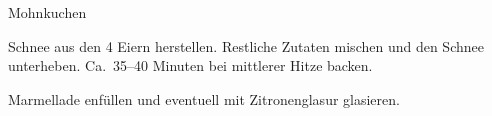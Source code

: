 \begin{recipe}[\vegetarian]{Mohnkuchen}

    \begin{ingredients}
    \end{ingredients}

    \begin{instructions}
        Schnee aus den 4 Eiern herstellen.
        Restliche Zutaten mischen und den Schnee unterheben.
        Ca.\ 35--40 Minuten bei mittlerer Hitze backen.

        Marmellade enfüllen und eventuell mit Zitronenglasur glasieren.
    \end{instructions}
\end{recipe}
